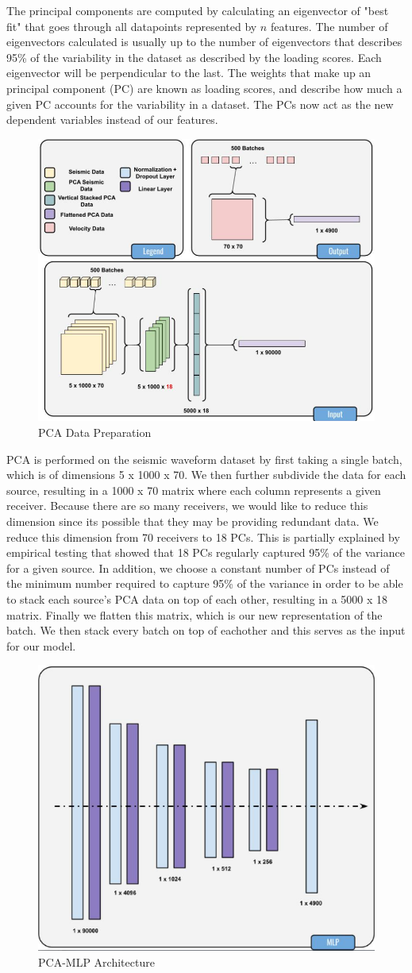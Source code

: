 \documentclass{article}
\begin{document}
The principal components are computed by calculating an eigenvector of "best fit" that goes through all datapoints represented by $n$ features. The number of eigenvectors calculated is usually up to the number of eigenvectors that describes 95\% of the variability in the dataset as described by the loading scores. Each eigenvector will be perpendicular to the last. The weights that make up an principal component (PC) are known as loading scores, and describe how much a given PC accounts for the variability in a dataset. The PCs now act as the new dependent variables instead of our features.
\begin{figure}[H]
    \centering
    \includegraphics[width=0.5\linewidth]{figures/PCA1.png}
    \caption{PCA Data Preparation}
    \label{fig:pca1}
\end{figure}  
PCA is performed on the seismic waveform dataset by first taking a single batch, which is of dimensions 5 x 1000 x 70. We then further subdivide the data for each source, resulting in a 1000 x 70 matrix where each column represents a given receiver. Because there are so many receivers, we would like to reduce this dimension since its possible that they may be providing redundant data. We reduce this dimension from 70 receivers to 18 PCs. This is partially explained by empirical testing that showed that 18 PCs regularly captured 95\% of the variance for a given source. In addition, we choose a constant number of PCs instead of the minimum number required to capture 95\% of the variance in order to be able to stack each source's PCA data on top of each other, resulting in a 5000 x 18 matrix. Finally we flatten this matrix, which is our new representation of the batch. We then stack every batch on top of eachother and this serves as the input for our model.  

\begin{figure}[H]
    \centering
    \includegraphics[width=0.5\linewidth]{figures/PCA2.png}
    \caption{PCA-MLP Architecture}
    \label{fig:pca2}
\end{figure}   
\end{document}

